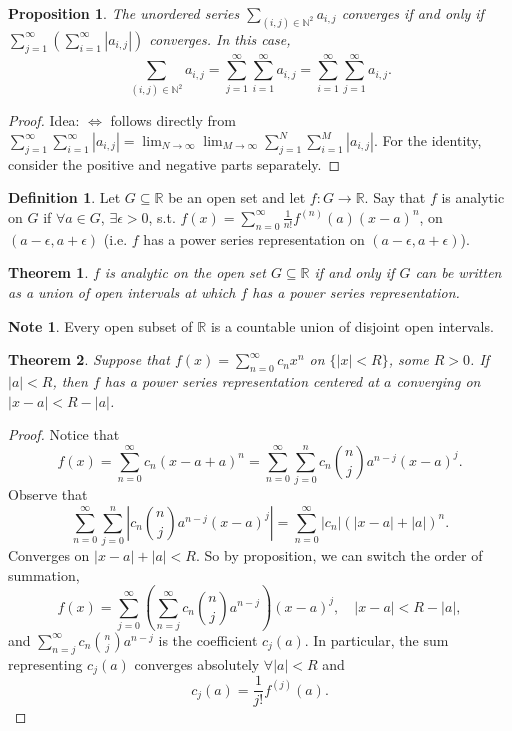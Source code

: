 \documentclass[12pt]{article}
\theoremstyle{plain}
\newtheorem{thm}{Theorem}
\newtheorem*{prop}{Proposition}
\theoremstyle{definition}
\newtheorem*{defn}{Definition}
\newtheorem*{note}{Note}
\begin{document}
\begin{prop}
    The unordered series $\sum_{(i,j)\in\mathbb{N}^2} a_{i,j}$ converges if and only if $\sum_{j=1}^\infty
    \left(\sum_{i=1}^\infty |a_{i,j}|\right)$ converges.
    In this case,
    \[\sum_{(i,j)\in\mathbb{N}^2} a_{i,j} = \sum_{j=1}^\infty \sum_{i=1}^\infty a_{i,j} = \sum_{i=1}^\infty
    \sum_{j=1}^\infty a_{i,j}.\]
\end{prop}
\begin{proof}
    Idea: $\Leftrightarrow$ follows directly from $\sum_{j=1}^\infty \sum_{i=1}^\infty |a_{i,j}| =
    \lim_{N\rightarrow\infty} \lim_{M\rightarrow\infty} \sum_{j=1}^N\sum_{i=1}^M |a_{i,j}|$.
    For the identity, consider the positive and negative parts separately.
\end{proof}

\begin{defn}
    Let $G\subseteq \mathbb{R}$ be an open set and let $f:G\rightarrow\mathbb{R}$.
    Say that $f$ is analytic on $G$ if $\forall a\in G$, $\exists \epsilon>0$, s.t.
    $f(x)=\sum_{n=0}^\infty \frac{1}{n!}f^{(n)}(a)(x-a)^n$, on $(a-\epsilon,a+\epsilon)$ (i.e. $f$ has a power
    series representation on $(a-\epsilon,a+\epsilon)$).
\end{defn}

\begin{thm}
    $f$ is analytic on the open set $G\subseteq\mathbb{R}$ if and only if $G$ can be written as a union of
    open intervals at which $f$ has a power series representation.
\end{thm}
\begin{note}
    Every open subset of $\mathbb{R}$ is a countable union of disjoint open intervals.
\end{note}

\begin{thm}
    Suppose that $f(x)=\sum_{n=0}^\infty c_nx^n$ on $\{|x|<R\}$, some $R>0$.
    If $|a|<R$, then $f$ has a power series representation centered at $a$ converging on $|x-a|<R-|a|$.
\end{thm}
\begin{proof}
    Notice that
    \[f(x)=\sum_{n=0}^\infty c_n (x-a+a)^n = \sum_{n=0}^\infty \sum_{j=0}^n c_n \binom{n}{j} a^{n-j}
    (x-a)^j.\]
    Observe that
    \[\sum_{n=0}^\infty \sum_{j=0}^n \left| c_n \binom{n}{j} a^{n-j} (x-a)^j\right|
    = \sum_{n=0}^\infty |c_n|(|x-a|+|a|)^n.\]
    Converges on $|x-a|+|a|<R$.
    So by proposition, we can switch the order of summation,
    \[f(x)=\sum_{j=0}^\infty \left(\sum_{n=j}^\infty c_n \binom{n}{j} a^{n-j}\right) (x-a)^j,\quad
    |x-a|<R-|a|,\]
    and $\sum_{n=j}^\infty c_n \binom{n}{j} a^{n-j}$ is the coefficient $c_j(a)$.
    In particular, the sum representing $c_j(a)$ converges absolutely $\forall |a|<R$ and
    \[c_j(a) = \frac{1}{j!}f^{(j)}(a).\]
\end{proof}
\end{document}
